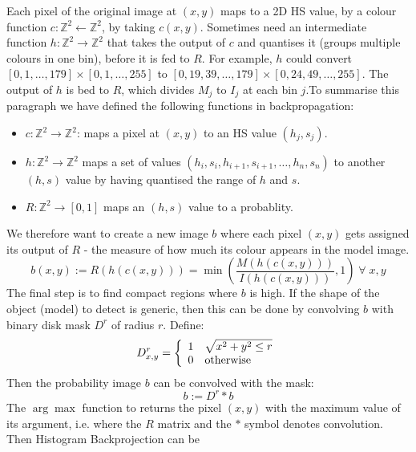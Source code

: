 \documentclass[a4paper]{article}
\begin{document}
Each pixel of the original image at $(x,y)$ maps to a 2D HS value, by a colour function $c: \mathbb{Z}^2 \leftarrow \mathbb{Z}^2$, by taking $c(x,y)$. Sometimes need an intermediate function $h:\mathbb{Z}^2 \rightarrow \mathbb{Z}^2$ that takes the output of $c$ and quantises it (groups multiple colours in one bin), before it is fed to $R$. For example, $h$ could convert $[0,1,\ldots,179] \times [0,1,\ldots,255]$ to $[0, 19, 39, \ldots,179] \times [0, 24, 49, \ldots, 255]$. The output of $h$ is bed to $R$, which divides $M_j$ to $I_j$ at each bin $j$.To summarise this paragraph we have  defined the following functions in backpropagation:
\begin{itemize}
    \item $c: \mathbb{Z}^2 \rightarrow \mathbb{Z}^2$: maps a pixel at $(x,y)$ to an HS value $(h_j,s_j)$.
    \item $h: \mathbb{Z}^2 \rightarrow \mathbb{Z}^2$ maps a set of values $(h_i,s_i,h_{i+1},s_{i+1},\ldots,h_n,s_n)$ to another $(h,s)$ value by having quantised the range of $h$ and $s$.
    \item $R: \mathbb{Z}^2 \rightarrow [0,1]$ maps an $(h,s)$ value to a probablity.
\end{itemize}
We therefore want to create a new image $b$ where each pixel $(x,y)$ gets assigned its output of $R$ - the measure of how much its colour appears in the model image. 
\begin{equation}
    b(x,y) := R\left(h\left(c(x,y)\right)\right)=
    \min\left(\frac{M\left(h\left(c(x,y)\right)\right)}{I\left(h\left(c(x,y)\right)\right)},1\right) \; \forall \; x,y
\end{equation}
The final step is to find compact regions where $b$ is high. If the shape of the object (model) to detect is generic, then this can be done by convolving $b$ with binary disk mask $D^r$ of radius $r$. Define:
\begin{equation}
    D_{x,y}^r = \left\{
\begin{array}{ll}
      1 & \sqrt{x^2+y^2\leq r} \\
      0 & \textup{otherwise}\\
\end{array} 
\right. 
\end{equation}
Then the probability image $b$ can be convolved with the mask:
\begin{equation}
    b := D^r \ast b
\end{equation}
The $\arg \max$ function to returns the pixel $(x, y)$ with
the maximum value of its argument, i.e. where the $R$ matrix and the $\ast$ symbol denotes convolution. Then Histogram Backprojection can be
\end{document}

